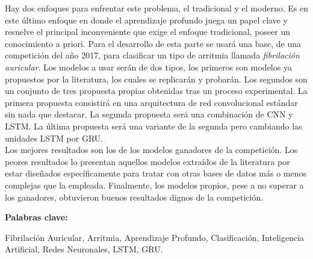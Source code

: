     Hay dos enfoques para enfrentar este problema, el tradicional y el moderno. Es en este último enfoque en donde el aprendizaje profundo juega un papel clave y resuelve el principal inconveniente que exige el enfoque tradicional, poseer un conocimiento a priori. Para el desarrollo de esta parte se usará una base, de una competición del año 2017, para clasificar un tipo de arritmia llamada \textit{fibrilación auricular}. Los modelos a usar serán de dos tipos, los primeros son modelos ya propuestos por la literatura, los cuales se replicarán y probarán. Los segundos son un conjunto de tres propuesta propias obtenidas tras un proceso experimental. La primera propuesta consistirá en una arquitectura de red convolucional estándar sin nada que destacar. La segunda propuesta será una combinación de CNN y LSTM. La última propuesta será una variante de la segunda pero cambiando las unidades LSTM por GRU. \\
    
    Los mejores resultados son los de los modelos ganadores de la competición. Los peores resultados lo presentan aquellos modelos extraídos de la literatura por estar diseñados específicamente para tratar con otras bases de datos más o menos complejas que la empleada. Finalmente, los modelos propios, pese a no superar a los ganadores, obtuvieron buenos resultados dignos de la competición. \\
    
    \begin{center}
        \textbf{Palabras clave:}
        \begin{center}
            Fibrilación Auricular, Arritmia, Aprendizaje Profundo, Clasificación, Inteligencia Artificial, Redes Neuronales, LSTM, GRU. 
        \end{center}
    \end{center}
    


    






\endinput
